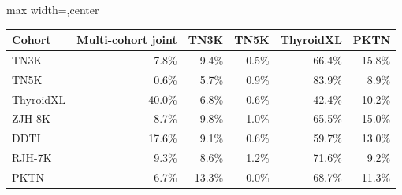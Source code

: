 \begin{responsetable}
\caption{}
\begin{adjustbox}{max width=\textwidth,center}
\begin{tabular}{@{}l r r r r r@{}}
\toprule
Cohort & Multi-cohort joint & TN3K & TN5K & ThyroidXL & PKTN \\
\midrule
TN3K & 7.8\% & 9.4\% & 0.5\% & 66.4\% & 15.8\% \\
TN5K & 0.6\% & 5.7\% & 0.9\% & 83.9\% & 8.9\% \\
ThyroidXL & 40.0\% & 6.8\% & 0.6\% & 42.4\% & 10.2\% \\
ZJH-8K & 8.7\% & 9.8\% & 1.0\% & 65.5\% & 15.0\% \\
DDTI & 17.6\% & 9.1\% & 0.6\% & 59.7\% & 13.0\% \\
RJH-7K & 9.3\% & 8.6\% & 1.2\% & 71.6\% & 9.2\% \\
PKTN & 6.7\% & 13.3\% & 0.0\% & 68.7\% & 11.3\% \\
\bottomrule
\end{tabular}
\end{adjustbox}
\end{responsetable}
